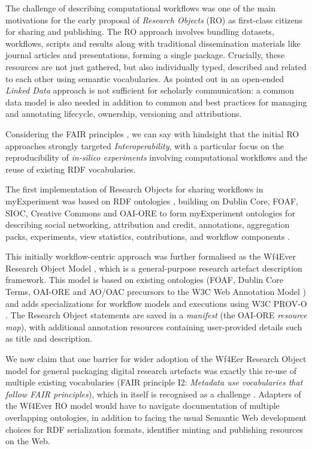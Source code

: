 \documentclass[ds,v1.1.2,openaccess]{iosart2x}%
\begin{document}
The challenge of describing computational workflows was one of the main
motivations for the early proposal of \textit{Research Objects} (RO)
\cite{doi:10.1016/j.future.2011.08.004} as first-class citizens for sharing
and publishing. The RO approach involves bundling datasets, workflows,
scripts and results along with traditional dissemination materials like
journal articles and presentations, forming a single package.
Crucially, these resources are not just gathered, but also individually
typed, described and related to each other using semantic vocabularies.
As pointed out in \cite{doi:10.1016/j.future.2011.08.004} an open-ended
\textit{Linked Data} approach is not sufficient for scholarly communication: a
common data model is also needed in addition to common and best
practices for managing and annotating lifecycle, ownership, versioning
and attributions.

Considering the FAIR principles \cite{doi:10.1038/sdata.2016.18}, we can
say with hindsight that the initial RO approaches strongly targeted
\textit{Interoperability}, with a particular focus on the reproducibility of
\textit{in-silico experiments} involving computational workflows and the reuse
of existing RDF vocabularies.

The first implementation of Research Objects for sharing workflows in
myExperiment \cite{doi:10.1093/nar/gkq429} was based on RDF ontologies
\cite{newman2009}, building on Dublin Core, FOAF, SIOC, Creative Commons
and OAI-ORE to form myExperiment ontologies for describing social
networking, attribution and credit, annotations, aggregation packs,
experiments, view statistics, contributions, and workflow components
\cite{myExperimentOntology2009}.

This initially workflow-centric approach was further formalised as the
Wf4Ever Research Object Model \cite{doi:10.1016/j.websem.2015.01.003},
which is a general-purpose research artefact description framework.
This model is based on existing ontologies (FOAF, Dublin Core Terms,
OAI-ORE and AO/OAC precursors to the W3C Web Annotation Model
\cite{Ciccarese:17:WAD}) and adds specializations for workflow models and
executions using W3C PROV-O \cite{PROVO}. The Research Object statements
are saved in a \textit{manifest} (the OAI-ORE \textit{resource map}), with additional
annotation resources containing user-provided details such as title and
description.

We now claim that one barrier for wider adoption of the Wf4Eer Research
Object model for general packaging digital research artefacts was
exactly this re-use of multiple existing vocabularies (FAIR principle
I2: \textit{Metadata use vocabularies that follow FAIR principles}), which in
itself is recognised as a challenge \cite{doi:10.3233/978-1-61499-660-6-9}.
Adapters of the Wf4Ever RO model would have to navigate documentation
of multiple overlapping ontologies, in addition to facing the usual
Semantic Web development choices for RDF serialization formats,
identifier minting and publishing resources on the Web.
\end{document}
